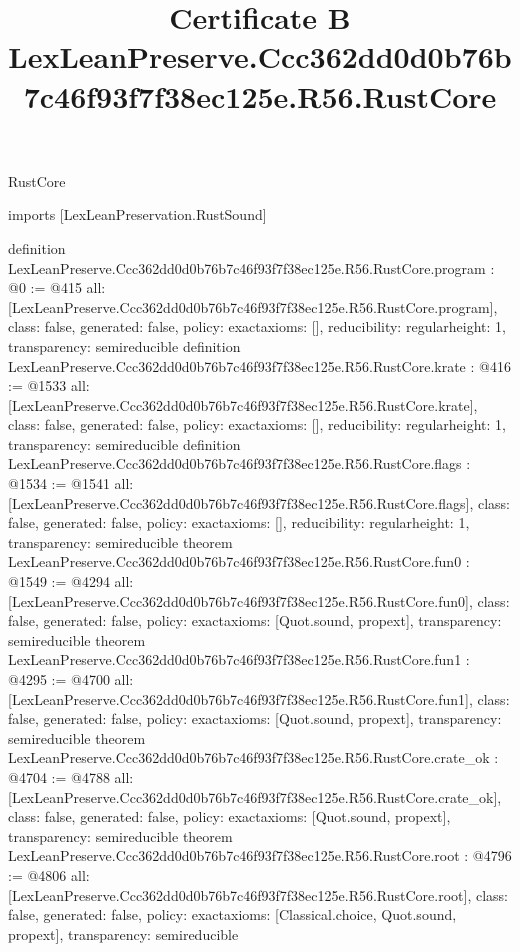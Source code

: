 \begin{lexlean}{RustCore}
\title{Certificate B LexLeanPreserve.Ccc362dd0d0b76b7c46f93f7f38ec125e.R56.RustCore}
\begin{coremodule}
imports [LexLeanPreservation.RustSound]

definition LexLeanPreserve.Ccc362dd0d0b76b7c46f93f7f38ec125e.R56.RustCore.program : @0 := @415 {
  all: [LexLeanPreserve.Ccc362dd0d0b76b7c46f93f7f38ec125e.R56.RustCore.program],
  class: false,
  generated: false,
  policy: exact{axioms: []},
  reducibility: regular{height: 1},
  transparency: semireducible
}
definition LexLeanPreserve.Ccc362dd0d0b76b7c46f93f7f38ec125e.R56.RustCore.krate : @416 := @1533 {
  all: [LexLeanPreserve.Ccc362dd0d0b76b7c46f93f7f38ec125e.R56.RustCore.krate],
  class: false,
  generated: false,
  policy: exact{axioms: []},
  reducibility: regular{height: 1},
  transparency: semireducible
}
definition LexLeanPreserve.Ccc362dd0d0b76b7c46f93f7f38ec125e.R56.RustCore.flags : @1534 := @1541 {
  all: [LexLeanPreserve.Ccc362dd0d0b76b7c46f93f7f38ec125e.R56.RustCore.flags],
  class: false,
  generated: false,
  policy: exact{axioms: []},
  reducibility: regular{height: 1},
  transparency: semireducible
}
theorem LexLeanPreserve.Ccc362dd0d0b76b7c46f93f7f38ec125e.R56.RustCore.fun0 : @1549 := @4294 {
  all: [LexLeanPreserve.Ccc362dd0d0b76b7c46f93f7f38ec125e.R56.RustCore.fun0],
  class: false,
  generated: false,
  policy: exact{axioms: [Quot.sound, propext]},
  transparency: semireducible
}
theorem LexLeanPreserve.Ccc362dd0d0b76b7c46f93f7f38ec125e.R56.RustCore.fun1 : @4295 := @4700 {
  all: [LexLeanPreserve.Ccc362dd0d0b76b7c46f93f7f38ec125e.R56.RustCore.fun1],
  class: false,
  generated: false,
  policy: exact{axioms: [Quot.sound, propext]},
  transparency: semireducible
}
theorem LexLeanPreserve.Ccc362dd0d0b76b7c46f93f7f38ec125e.R56.RustCore.crate_ok : @4704 := @4788 {
  all: [LexLeanPreserve.Ccc362dd0d0b76b7c46f93f7f38ec125e.R56.RustCore.crate_ok],
  class: false,
  generated: false,
  policy: exact{axioms: [Quot.sound, propext]},
  transparency: semireducible
}
theorem LexLeanPreserve.Ccc362dd0d0b76b7c46f93f7f38ec125e.R56.RustCore.root : @4796 := @4806 {
  all: [LexLeanPreserve.Ccc362dd0d0b76b7c46f93f7f38ec125e.R56.RustCore.root],
  class: false,
  generated: false,
  policy: exact{axioms: [Classical.choice, Quot.sound, propext]},
  transparency: semireducible
}


\end{coremodule}
\end{lexlean}
